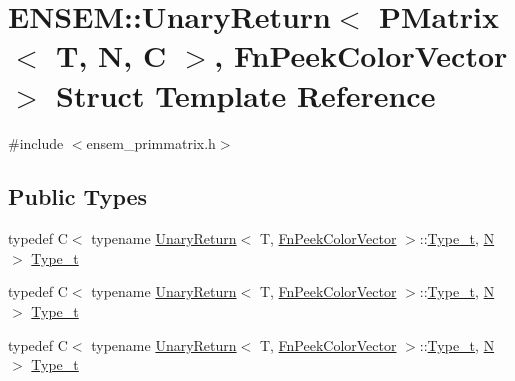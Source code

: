 \hypertarget{structENSEM_1_1UnaryReturn_3_01PMatrix_3_01T_00_01N_00_01C_01_4_00_01FnPeekColorVector_01_4}{}\section{E\+N\+S\+EM\+:\+:Unary\+Return$<$ P\+Matrix$<$ T, N, C $>$, Fn\+Peek\+Color\+Vector $>$ Struct Template Reference}
\label{structENSEM_1_1UnaryReturn_3_01PMatrix_3_01T_00_01N_00_01C_01_4_00_01FnPeekColorVector_01_4}


{\ttfamily \#include $<$ensem\+\_\+primmatrix.\+h$>$}

\subsection*{Public Types}
\begin{DoxyCompactItemize}
\item 
typedef C$<$ typename \mbox{\hyperlink{structENSEM_1_1UnaryReturn}{Unary\+Return}}$<$ T, \mbox{\hyperlink{structENSEM_1_1FnPeekColorVector}{Fn\+Peek\+Color\+Vector}} $>$\+::\mbox{\hyperlink{structENSEM_1_1UnaryReturn_3_01PMatrix_3_01T_00_01N_00_01C_01_4_00_01FnPeekColorVector_01_4_a4b620d05d14bc1c08dc440f5f444f0e9}{Type\+\_\+t}}, \mbox{\hyperlink{adat__devel_2lib_2hadron_2operator__name__util_8cc_a7722c8ecbb62d99aee7ce68b1752f337}{N}} $>$ \mbox{\hyperlink{structENSEM_1_1UnaryReturn_3_01PMatrix_3_01T_00_01N_00_01C_01_4_00_01FnPeekColorVector_01_4_a4b620d05d14bc1c08dc440f5f444f0e9}{Type\+\_\+t}}
\item 
typedef C$<$ typename \mbox{\hyperlink{structENSEM_1_1UnaryReturn}{Unary\+Return}}$<$ T, \mbox{\hyperlink{structENSEM_1_1FnPeekColorVector}{Fn\+Peek\+Color\+Vector}} $>$\+::\mbox{\hyperlink{structENSEM_1_1UnaryReturn_3_01PMatrix_3_01T_00_01N_00_01C_01_4_00_01FnPeekColorVector_01_4_a4b620d05d14bc1c08dc440f5f444f0e9}{Type\+\_\+t}}, \mbox{\hyperlink{adat__devel_2lib_2hadron_2operator__name__util_8cc_a7722c8ecbb62d99aee7ce68b1752f337}{N}} $>$ \mbox{\hyperlink{structENSEM_1_1UnaryReturn_3_01PMatrix_3_01T_00_01N_00_01C_01_4_00_01FnPeekColorVector_01_4_a4b620d05d14bc1c08dc440f5f444f0e9}{Type\+\_\+t}}
\item 
typedef C$<$ typename \mbox{\hyperlink{structENSEM_1_1UnaryReturn}{Unary\+Return}}$<$ T, \mbox{\hyperlink{structENSEM_1_1FnPeekColorVector}{Fn\+Peek\+Color\+Vector}} $>$\+::\mbox{\hyperlink{structENSEM_1_1UnaryReturn_3_01PMatrix_3_01T_00_01N_00_01C_01_4_00_01FnPeekColorVector_01_4_a4b620d05d14bc1c08dc440f5f444f0e9}{Type\+\_\+t}}, \mbox{\hyperlink{adat__devel_2lib_2hadron_2operator__name__util_8cc_a7722c8ecbb62d99aee7ce68b1752f337}{N}} $>$ \mbox{\hyperlink{structENSEM_1_1UnaryReturn_3_01PMatrix_3_01T_00_01N_00_01C_01_4_00_01FnPeekColorVector_01_4_a4b620d05d14bc1c08dc440f5f444f0e9}{Type\+\_\+t}}
\end{DoxyCompactItemize}


